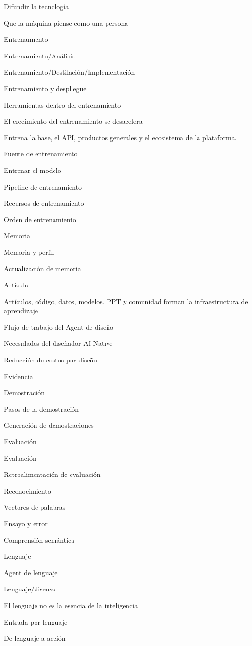 \documentclass{article}
\begin{document}
Difundir la tecnología

Que la máquina piense como una persona

Entrenamiento

Entrenamiento/Análisis

Entrenamiento/Destilación/Implementación

Entrenamiento y despliegue

Herramientas dentro del entrenamiento

El crecimiento del entrenamiento se desacelera

Entrena la base, el API, productos generales y el ecosistema de la plataforma.

Fuente de entrenamiento

Entrenar el modelo

Pipeline de entrenamiento

Recursos de entrenamiento

Orden de entrenamiento

Memoria

Memoria y perfil

Actualización de memoria

Artículo

Artículos, código, datos, modelos, PPT y comunidad forman la infraestructura de aprendizaje

Flujo de trabajo del Agent de diseño

Necesidades del diseñador AI Native

Reducción de costos por diseño

Evidencia

Demostración

Pasos de la demostración

Generación de demostraciones

Evaluación

Evaluación

Retroalimentación de evaluación

Reconocimiento

Vectores de palabras

Ensayo y error

Comprensión semántica

Lenguaje

Agent de lenguaje

Lenguaje/disenso

El lenguaje no es la esencia de la inteligencia

Entrada por lenguaje

De lenguaje a acción
\end{document}
